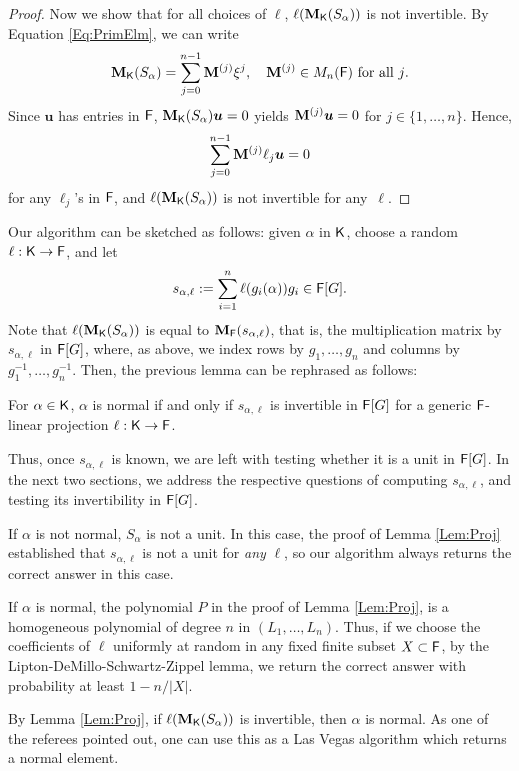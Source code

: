 \begin{proof}
  Now we show that for all choices of $\ell$, $\ell(\mat M_\K(S_\alpha))$ is not invertible. By Equation \eqref{Eq:PrimElm}, we can write
  $$\mat M_\K(S_\alpha) = \sum_{j = 0}^{n-1} \mat M^{(j)} \xbar^j, \quad 
  \mat M^{(j)} \in M_{n}(\F) \text{~for all $j$}.$$ 
  Since $\boldsymbol{u}$ has entries in ${\mathsf{F}}$,
  $\mat M_\K(S_\alpha) \boldsymbol{u} =0$ yields
  $\mat M^{(j)}\boldsymbol{u} = 0$ for
  $j \in \lbrace 1, \ldots , n \rbrace$. Hence,
$$\sum_{j = 0}^{n-1} \mat M^{(j)} \ell_j \boldsymbol{u} = 0$$ for any 
$\ell_j$'s in ${\mathsf{F}}$, and $\ell(\mat M_\K(S_\alpha))$ is not invertible for any~$\ell$.
\end{proof} 
Our algorithm can be sketched as follows: given $\alpha$ in ${\mathsf{K}}$,
choose a random $\ell: {\mathsf{K}}\to{\mathsf{F}}$, and let
\begin{equation}\label{def:s_alpha_ell}
s_{\alpha,\ell}:=\sum_{i=1}^n \ell(g_i(\alpha))g_i \in {\mathsf{F}}[G].
\end{equation}
Note that $\ell(\mat M_\K(S_\alpha))$ is equal to $\mat
M_\F(s_{\alpha,\ell})$, that is, the multiplication matrix by
$s_{\alpha,\ell}$ in ${\mathsf{F}}[G]$, where, as above, we index rows by
$g_1,\dots,g_n$ and columns by $g_1^{-1},\dots,g_n^{-1}$.  Then,
the previous lemma can be rephrased as follows:
\begin{lemma}
  \label{Lem:Proj-bis}
  For $\alpha \in {\mathsf{K}}$, $\alpha$ is normal if and only if
  $s_{\alpha,\ell}$ is invertible in ${\mathsf{F}}[G]$ for a generic
  ${\mathsf{F}}$-linear projection $\ell: {\mathsf{K}} \to {\mathsf{F}}$.
\end{lemma}
Thus, once $s_{\alpha,\ell}$ is known, we are left with testing
whether it is a unit in ${\mathsf{F}}[G]$. In the next two sections, we address
the respective questions of computing $s_{\alpha,\ell}$, and testing
its invertibility in ${\mathsf{F}}[G]$.
\begin{remark}\label{rmk:mc-epsilon}
If $\alpha$ is not normal, $S_\alpha$ is not a unit. In this case, the
proof of Lemma \ref{Lem:Proj} established that $s_{\alpha,\ell}$ is
not a unit for {\em any} $\ell$, so our algorithm always returns the
correct answer in this case.

If $\alpha$ is normal, the polynomial $P$ in the proof of Lemma
\ref{Lem:Proj}, is a homogeneous polynomial of degree $n$ in $(L_1,
\ldots , L_n)$. Thus, if we choose the coefficients of $\ell$ uniformly at
random in any fixed finite subset $X \subset {\mathsf{F}}$, by the
Lipton-DeMillo-Schwartz-Zippel lemma, we return the correct 
answer with probability at least $1-n/|X|$. 

By Lemma \ref{Lem:Proj}, if $\ell(\mat M_\K(S_\alpha))$ is invertible, then $\alpha$ is normal. 
As one of the referees pointed out, one can use this as a Las Vegas 
algorithm which returns a normal element.
\end{remark}





